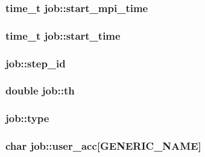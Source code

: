 \subsubsection[{\texorpdfstring{start\+\_\+mpi\+\_\+time}{start_mpi_time}}]{\setlength{\rightskip}{0pt plus 5cm}time\+\_\+t job\+::start\+\_\+mpi\+\_\+time}\hypertarget{structjob_a207f6300ea72581b602b810d810c06b0}{}\label{structjob_a207f6300ea72581b602b810d810c06b0}
\subsubsection[{\texorpdfstring{start\+\_\+time}{start_time}}]{\setlength{\rightskip}{0pt plus 5cm}time\+\_\+t job\+::start\+\_\+time}\hypertarget{structjob_a6453c9870ac207fc58340cb03b3e062f}{}\label{structjob_a6453c9870ac207fc58340cb03b3e062f}
\subsubsection[{\texorpdfstring{step\+\_\+id}{step_id}}]{ job\+::step\+\_\+id}\hypertarget{structjob_a8408254d81fc3e4674c44e37dcc8927e}{}\label{structjob_a8408254d81fc3e4674c44e37dcc8927e}
\subsubsection[{\texorpdfstring{th}{th}}]{\setlength{\rightskip}{0pt plus 5cm}double job\+::th}\hypertarget{structjob_a3234acc2eb607e1a7cb69da68c81ea00}{}\label{structjob_a3234acc2eb607e1a7cb69da68c81ea00}
\subsubsection[{\texorpdfstring{type}{type}}]{ job\+::type}\hypertarget{structjob_afec31cc8c3c88d4c554a7bcb6307da8c}{}\label{structjob_afec31cc8c3c88d4c554a7bcb6307da8c}
\subsubsection[{\texorpdfstring{user\+\_\+acc}{user_acc}}]{\setlength{\rightskip}{0pt plus 5cm}char job\+::user\+\_\+acc\mbox{[}{\bf G\+E\+N\+E\+R\+I\+C\+\_\+\+N\+A\+ME}\mbox{]}}\hypertarget{structjob_af5a26f0b756dedb4094cd26fe79a0b2a}{}\label{structjob_af5a26f0b756dedb4094cd26fe79a0b2a}
